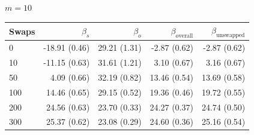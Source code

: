 \begin{table}[H]
\begin{tabular}{l rrrr}
\bottomrule
\end{tabular}
\par\medskip
\noindent\textit{$m = 10$}\\[2pt]
\begin{tabular}{l rrrr}
\toprule
Swaps & $\beta_s$ & $\beta_o$ & $\beta_{\mathrm{overall}}$ & $\beta_{\mathrm{unswapped}}$ \\
\midrule
0 & -18.91 (0.46) & 29.21 (1.31) & -2.87 (0.62) & -2.87 (0.62) \\
10 & -11.15 (0.63) & 31.61 (1.21) & 3.10 (0.67) & 3.16 (0.67) \\
50 & 4.09 (0.66) & 32.19 (0.82) & 13.46 (0.54) & 13.69 (0.58) \\
100 & 14.46 (0.65) & 29.15 (0.52) & 19.36 (0.46) & 19.72 (0.55) \\
200 & 24.56 (0.63) & 23.70 (0.33) & 24.27 (0.37) & 24.74 (0.50) \\
300 & 25.37 (0.62) & 23.08 (0.29) & 24.60 (0.36) & 25.16 (0.54) \\
\bottomrule
\end{tabular}
\end{table}

